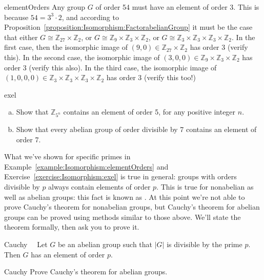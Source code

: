 \begin{example}{elementOrders}  Any group $G$ of order 54 must have an element of order 3. This is because $54 =  3^3 \cdot 2$, and according to     
Proposition~\ref{proposition:Isomorphism:FactorabelianGroup} it must be the case that either $G \cong {\mathbb Z}_{27} \times {\mathbb Z}_2$, or  $G \cong {\mathbb Z}_9 \times {\mathbb Z}_3 \times {\mathbb Z}_2$, or 
$G \cong {\mathbb Z}_{3} \times {\mathbb Z}_{3} \times {\mathbb Z}_{3} \times {\mathbb Z}_2$.  In the first case, then the isomorphic image of $(9,0) \in {\mathbb Z}_{27} \times {\mathbb Z}_2$ has order 3 (verify this).  In the second case, the isomorphic image of $(3,0,0) \in {\mathbb Z}_{9} \times {\mathbb Z}_3 \times {\mathbb Z}_2$ has order 3 (verify this also). In the third case, the isomorphic image of $(1,0,0,0) \in {\mathbb Z}_{3} \times {\mathbb Z}_3 \times {\mathbb Z}_3 \times {\mathbb Z}_2$ has order 3 (verify this too!) 
\end{example}

\begin{exercise}{exel}
\begin{enumerate}[(a)]
\item
Show that $\mathbb{Z}_{5^n}$ contains an element of order 5, for any positive integer $n$.
\item
Show that every abelian group of order divisible by 7 contains an element of order 7.  
\end{enumerate}
\end{exercise}

What we've shown for specific primes in Example~\ref{example:Isomorphism:elementOrders} and Exercise~\ref{exercise:Isomorphism:exel} is  true in general: groups with orders divisible by $p$ always contain elements of order $p$. This is true for nonabelian as well as abelian groups:  this fact is known as .  At this point we're not able to prove Cauchy's theorem for nonabelian groups, but Cauchy's theorem for abelian groups can be proved using methods similar to those above.  We'll state the theorem formally, then ask you to prove it.

\begin{prop}{Cauchy} ~~Let $G$ be an abelian  group such that $|G|$ is divisible by the prime $p$. Then $G$ has an element of order $p$.  
\end{prop}

\begin{exercise}{Cauchy}
Prove Cauchy's theorem for abelian groups.
\end{exercise}


